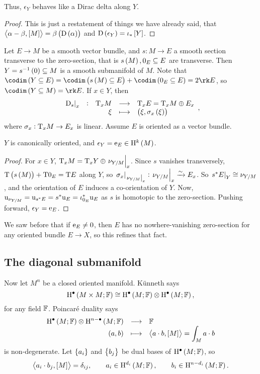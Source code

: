 Thus, $ \epsilon_Y $ behaves like a Dirac delta along $ Y $.

\begin{proof}
This is just a restatement of things we have already said, that $ \abr{\alpha - \beta, \sbr{M}} = \beta\br{\D\br{\alpha}} $ and $ \D\br{\epsilon_Y} = \iota_*\sbr{Y} $.
\end{proof}


Let $ E \to M $ be a smooth vector bundle, and $ s : M \to E $ a smooth section transverse to the zero-section, that is $ s\br{M}, 0_E \subseteq E $ are transverse. Then $ Y = s^{-1}\br{0} \subseteq M $ is a smooth submanifold of $ M $. Note that $ \codim \br{Y \subseteq E} = \codim \br{s\br{M} \subseteq E} + \codim \br{0_E \subseteq E} = 2\rk E $, so $ \codim \br{Y \subseteq M} = \rk E $. If $ x \in Y $, then
$$ \function[\eval{\D_s}_x]{\T_xM}{\T_xE = \T_xM \oplus E_x}{\xi}{\br{\xi, \sigma_x\br{\xi}}}, $$
where $ \sigma_x : \mathrm{T}_xM \to E_x $ is linear. Assume $ E $ is oriented as a vector bundle.

\pagebreak

\begin{proposition}
$ Y $ is canonically oriented, and $ \epsilon_Y = \e_E \in \H^k\br{M} $.
\end{proposition}

\begin{proof}
For $ x \in Y $, $ \mathrm{T}_xM = \mathrm{T}_xY \oplus \left. \nu_{Y / M} \right|_x $. Since $ s $ vanishes transversely, $ \T\br{s\br{M}} + \T0_E = \T E $ along $ Y $, so $ \left. \sigma_x \right|_{\left. \nu_{Y / M} \right|_x} : \left. \nu_{Y / M} \right|_x \xrightarrow{\sim} E_x $. So $ \left. s^*E \right|_Y \cong \nu_{Y / M} $, and the orientation of $ E $ induces a co-orientation of $ Y $. Now, $ \mathrm{u}_{\nu_{Y / M}} = \mathrm{u}_{s^*E} = s^*\mathrm{u}_E = \iota_{0_E}^*\mathrm{u}_E $ as $ s $ is homotopic to the zero-section. Pushing forward, $ \epsilon_Y = \mathrm{e}_E $.
\end{proof}

\begin{remark*}
We saw before that if $ \mathrm{e}_E \ne 0 $, then $ E $ has no nowhere-vanishing zero-section for any oriented bundle $ E \to X $, so this refines that fact.
\end{remark*}

\subsection{The diagonal submanifold}

Now let $ M^n $ be a closed oriented manifold. K\"unneth says
$$ \H^\bullet\br{M \times M; \FF} \cong \H^\bullet\br{M; \FF} \otimes \H^\bullet\br{M; \FF}, $$
for any field $ \mathbb{F} $. Poincar\'e duality says
$$ \function{\H^\bullet\br{M; \FF} \otimes \H^{n - \bullet}\br{M; \FF}}{\FF}{\br{a, b}}{\abr{a \cdot b, \sbr{M}} = \int_M a \cdot b} $$
is non-degenerate. Let $ \cbr{a_i} $ and $ \cbr{b_j} $ be dual bases of $ \H^\bullet\br{M; \FF} $, so
$$ \abr{a_i \cdot b_j, \sbr{M}} = \delta_{ij}, \qquad a_i \in \H^{d_i}\br{M; \FF}, \qquad b_i \in \H^{n - d_i}\br{M; \FF}. $$

